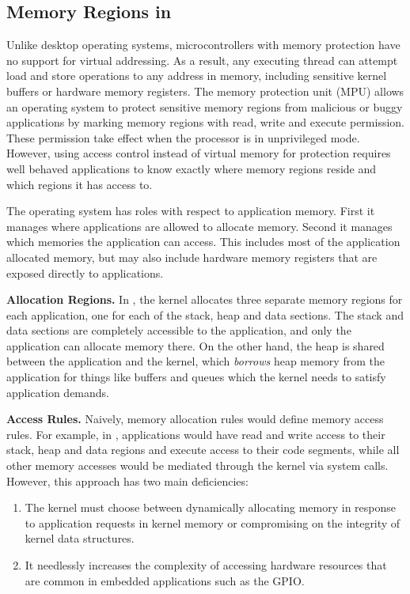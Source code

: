 \subsection{Memory Regions in \name}

Unlike desktop operating systems, microcontrollers with memory protection have
no support for virtual addressing. As a result, any executing thread can attempt
load and store operations to any address in memory, including sensitive kernel
buffers or hardware memory registers. The memory protection unit (MPU) allows an
operating system to protect sensitive memory regions from malicious or buggy
applications by marking memory regions with read, write and execute permission.
These permission take effect when the processor is in unprivileged mode.
However, using access control instead of virtual memory for protection requires
well behaved applications to know exactly where memory regions reside and which
regions it has access to.

The operating system has roles with respect to application memory. First it
manages where applications are allowed to allocate memory. Second it manages
which memories the application can access. This includes most of the application
allocated memory, but may also include hardware memory registers that are
exposed directly to applications.

{\bf Allocation Regions.} 
In \name, the kernel allocates three separate memory regions for each
application, one for each of the stack, heap and data sections. The stack and
data sections are completely accessible to the application, and only the
application can allocate memory there. On the other hand, the heap is shared
between the application and the kernel, which \emph{borrows} heap memory from
the application for things like buffers and queues which the kernel needs
to satisfy application demands.

{\bf Access Rules.}
Naively, memory allocation rules would define memory access rules. For example,
in \name, applications would have read and write access to their stack, heap and
data regions and execute access to their code segments, while all other memory
accesses would be mediated through the kernel via system calls. However, this
approach has two main deficiencies:

\begin{enumerate}
  \item The kernel must choose between dynamically allocating memory in response to
  application requests in kernel memory or compromising on the integrity of
  kernel data structures.

  \item It needlessly increases the complexity of accessing hardware resources
  that are common in embedded applications such as the GPIO.

\end{enumerate}


